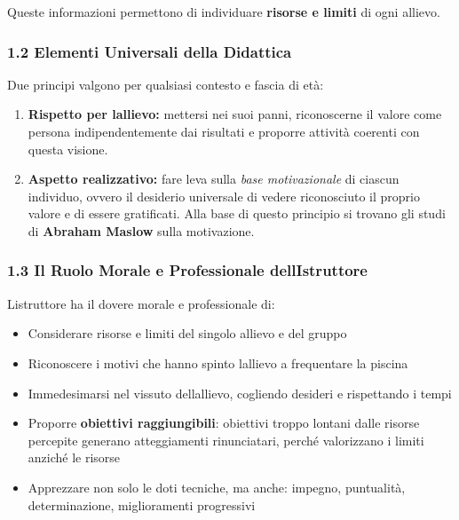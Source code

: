 \documentclass[a4paper,11pt]{article}
\providecommand{\tightlist}{%
  \setlength{\itemsep}{0pt}\setlength{\parskip}{0pt}}
\begin{document}
Queste informazioni permettono di individuare \textbf{risorse e limiti}
di ogni allievo.

\subsubsection{1.2 Elementi Universali della
      Didattica}\label{elementi-universali-della-didattica}

Due principi valgono per qualsiasi contesto e fascia di età:

\begin{enumerate}
      \tightlist
      \item
            \textbf{Rispetto per l\textquotesingle allievo:} mettersi nei suoi
            panni, riconoscerne il valore come persona indipendentemente dai
            risultati e proporre attività coerenti con questa visione.
      \item
            \textbf{Aspetto realizzativo:} fare leva sulla \emph{base
                  motivazionale} di ciascun individuo, ovvero il desiderio universale di
            vedere riconosciuto il proprio valore e di essere gratificati. Alla
            base di questo principio si trovano gli studi di \textbf{Abraham
                  Maslow} sulla motivazione.
\end{enumerate}

\subsubsection{1.3 Il Ruolo Morale e Professionale
      dell\textquotesingle Istruttore}\label{il-ruolo-morale-e-professionale-dellistruttore}

L\textquotesingle istruttore ha il dovere morale e professionale di:

\begin{itemize}
      \tightlist
      \item
            Considerare risorse e limiti del singolo allievo e del gruppo
      \item
            Riconoscere i motivi che hanno spinto l\textquotesingle allievo a
            frequentare la piscina
      \item
            Immedesimarsi nel vissuto dell\textquotesingle allievo, cogliendo
            desideri e rispettando i tempi
      \item
            Proporre \textbf{obiettivi raggiungibili}: obiettivi troppo lontani
            dalle risorse percepite generano atteggiamenti rinunciatari, perché
            valorizzano i limiti anziché le risorse
      \item
            Apprezzare non solo le doti tecniche, ma anche: impegno, puntualità,
            determinazione, miglioramenti progressivi
\end{itemize}
\end{document}
